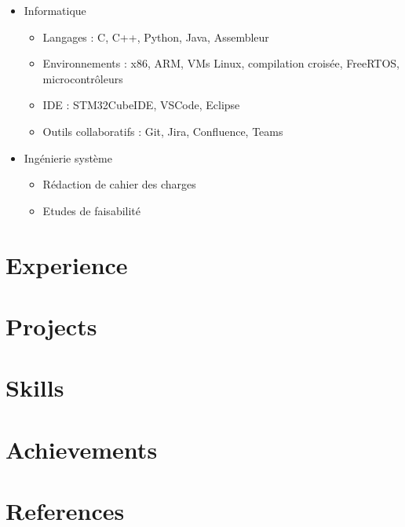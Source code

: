 \documentclass{article}
\begin{document}
\begin{flushright}
\begin{minipage}[t]{0.8\textwidth}
\begin{itemize}[label={}, leftmargin=*, topsep=0pt, partopsep=0pt, itemsep=0pt, parsep=0pt]
            \item Informatique 
            \begin{itemize}[label={--}, leftmargin=*, topsep=0pt, partopsep=0pt, itemsep=0pt, parsep=0pt] %
                \item \textcolor{gray!80}{Langages : C, C++, Python, Java, Assembleur}
                \item \textcolor{gray!80}{Environnements : x86, ARM, VMs Linux, compilation croisée, FreeRTOS, microcontrôleurs}
                \item \textcolor{gray!80}{IDE : STM32CubeIDE, VSCode, Eclipse}
                \item \textcolor{gray!80}{Outils collaboratifs : Git, Jira, Confluence, Teams}
            \end{itemize}
            \item Ingénierie système
            \begin{itemize}[label={--}, leftmargin=*, topsep=0pt, partopsep=0pt, itemsep=0pt, parsep=0pt] %
                \item \textcolor{gray!80}{Rédaction de cahier des charges}
                \item \textcolor{gray!80}{Etudes de faisabilité}
            \end{itemize}
        \end{itemize}
    \end{minipage}
\end{flushright}

\section{Experience}

\section{Projects}

\section{Skills}

\section{Achievements}

\section{References}
\end{document}
